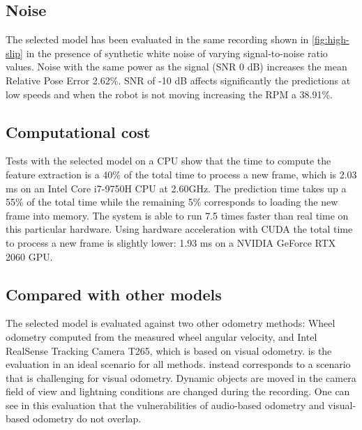 \subsection{Noise} The selected model has been evaluated in the same recording
shown in \cref{fig:high-slip} in the presence of synthetic white noise of
varying signal-to-noise ratio values. Noise with the same power as the signal
(SNR 0 dB) increases the mean Relative Pose Error 2.62\%. SNR of -10 dB affects
significantly the predictions at low speeds and when the robot is not moving
increasing the RPM a 38.91\%.


\subsection{Computational cost} Tests with the selected model on a CPU show
that the time to compute the feature extraction is a 40\% of the total time to
process a new frame, which is 2.03 ms on an Intel\textregistered{}
Core\texttrademark{} i7-9750H CPU at 2.60GHz. The prediction time takes up a
55\% of the total time while the remaining 5\% corresponds to loading the new
frame into memory. The system is able to run 7.5 times faster than real time on
this particular hardware. Using hardware acceleration with CUDA the total time
to process a new frame is slightly lower: 1.93 ms on a NVIDIA GeForce RTX 2060
GPU.

\subsection{Compared with other models} The selected model is evaluated against
two other odometry methods: Wheel odometry computed from the measured wheel
angular velocity, and Intel\textregistered{} RealSense\texttrademark{} Tracking
Camera T265, which is based on visual odometry.  is the
evaluation in an ideal scenario for all methods. 
instead corresponds to a scenario that is challenging for visual odometry.
Dynamic objects are moved in the camera field of view and lightning conditions
are changed during the recording. One can see in this evaluation that the
vulnerabilities of audio-based odometry and visual-based odometry do not
overlap.

